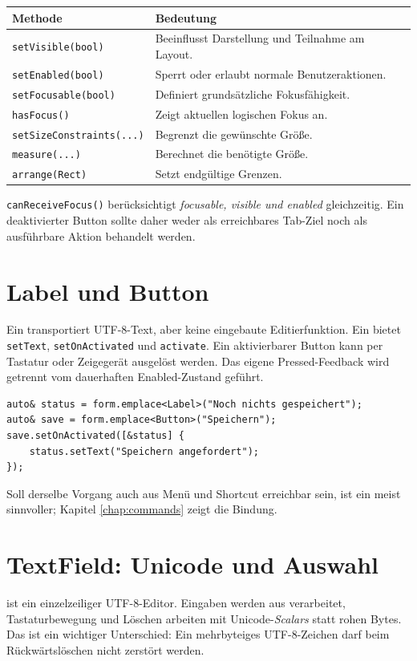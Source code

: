 \noindent\begin{tabularx}{\linewidth}{@{}p{39mm}X@{}}
\toprule
Methode & Bedeutung\\\midrule
\texttt{setVisible(bool)} & Beeinflusst Darstellung und Teilnahme am Layout.\\
\texttt{setEnabled(bool)} & Sperrt oder erlaubt normale Benutzeraktionen.\\
\texttt{setFocusable(bool)} & Definiert grundsätzliche Fokusfähigkeit.\\
\texttt{hasFocus()} & Zeigt aktuellen logischen Fokus an.\\
\texttt{setSizeConstraints(...)} & Begrenzt die gewünschte Größe.\\
\texttt{measure(...)} & Berechnet die benötigte Größe.\\
\texttt{arrange(Rect)} & Setzt endgültige Grenzen.\\
\bottomrule
\end{tabularx}
\texttt{canReceiveFocus()} berücksichtigt
\emph{focusable, visible und enabled} gleichzeitig.
Ein deaktivierter Button sollte daher weder als erreichbares
Tab-Ziel noch als ausführbare Aktion behandelt werden.

\section{Label und Button}
Ein  transportiert UTF-8-Text, aber keine
eingebaute Editierfunktion. Ein  bietet
\texttt{setText}, \texttt{setOnActivated} und
\texttt{activate}. Ein aktivierbarer Button kann per
Tastatur oder Zeigegerät ausgelöst werden. Das eigene
Pressed-Feedback wird getrennt vom dauerhaften Enabled-Zustand
geführt.

\begin{lstlisting}[language=SASDCpp]
auto& status = form.emplace<Label>("Noch nichts gespeichert");
auto& save = form.emplace<Button>("Speichern");
save.setOnActivated([&status] {
    status.setText("Speichern angefordert");
});
\end{lstlisting}
Soll derselbe Vorgang auch aus Menü und Shortcut erreichbar sein,
ist ein  meist sinnvoller; Kapitel
\ref{chap:commands} zeigt die Bindung.

\section{TextField: Unicode und Auswahl}
 ist ein einzelzeiliger UTF-8-Editor.
Eingaben werden aus  verarbeitet,
Tastaturbewegung und Löschen arbeiten mit
Unicode-\emph{Scalars} statt rohen Bytes.
Das ist ein wichtiger Unterschied: Ein mehrbyteiges UTF-8-Zeichen
darf beim Rückwärtslöschen nicht zerstört werden.

